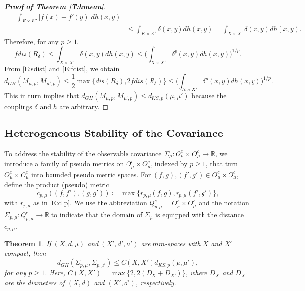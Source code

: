 \documentclass[11pt]{article}
\newtheorem{theorem}{Theorem}[section]
\theoremstyle{definition}
\newcommand{\real}{\ensuremath{\mathbb{R}}}
\newcommand{\cobs}[1]{\ensuremath{O^c_{#1}}}
\newcommand{\pcobsp}[1]{\ensuremath{Q^c_{p,#1}}}
\newcommand{\meanp}[1]{\ensuremath{M_{#1,p}}}
\newcommand{\dks}{\ensuremath{d_{KS,p}}}
\newcommand{\dgh}{\ensuremath{d_{GH}}}
\newcommand{\dlp}[1]{\ensuremath{r_{p,#1}}}
\newcommand{\dlpc}[1]{\ensuremath{c_{p,#1}}}
\newcommand{\covp}[1]{\ensuremath{\Sigma_{p,#1}}}
\begin{document}
\begin{proof}[\bf Proof of Theorem \ref{T:hmean}]
\begin{equation}
\begin{split}
= \int_{K\times K'} |f(x)-f'(y)| dh(x,y)\\
&\leq \int_{K\times K'} \delta(x,y) dh (x,y)
= \int_{X\times X'} \delta (x,y) dh (x,y).
\end{split}
\end{equation}
Therefore, for any $p\geq 1$,
\begin{equation} \label{E:fdist}
fdis(R_\delta) \leq \int_{X\times X'} \delta (x,y) dh (x,y)
\leq \Big(\int_{X\times X'} \delta^p (x,y) dh (x,y)\Big)^{1/p}.
\end{equation}
From \eqref{E:sdist} and \eqref{E:fdist}, we obtain
\begin{equation}
\dgh(\meanp{\mu}, \meanp{\mu'}) \leq \frac{1}{2} \max\{ dis (R_\delta), 2 fdis(R_\delta)\} \leq 
\Big(\int_{X\times X'} \delta^p (x,y) dh (x,y)\Big)^{1/p}.
\end{equation}
This in turn implies that $\dgh(\meanp{\mu}, \meanp{\mu'}) \leq \dks(\mu,\mu')$ because the couplings $\delta$ and $h$ are arbitrary.
\end{proof}


\subsection{Heterogeneous Stability of the Covariance}

To address the stability of the observable covariance $\Sigma_\mu \colon \cobs{\mu}\times \cobs{\mu} \to \real$, we introduce a family of pseudo metrics on $\cobs{\mu} \times \cobs{\mu}$, indexed by $p \geq 1$, that turn $\cobs{\mu} \times \cobs{\mu}$ into bounded pseudo metric spaces. For $(f,g), (f',g') \in \cobs{\mu} \times \cobs{\mu}$, define the product (pseudo) metric
\begin{equation} \label{E:dlpc}
\dlpc{\mu} ((f,f'), (g,g')) \coloneq
\max \{\dlp{\mu} (f,g), \dlp{\mu} (f',g')\},
\end{equation}
with $\dlp{\mu}$ as in \eqref{E:dlp}. We use the abbreviation $\pcobsp{\mu}= \cobs{\mu} \times \cobs{\mu}$ and the notation $\covp{\mu} \colon \pcobsp{\mu} \to \real$ to indicate that the domain of $\Sigma_\mu$ is equipped with the distance $\dlpc{\mu}$. 

\begin{theorem} \label{T:hcov}
If $(X,d,\mu)$ and $(X',d',\mu')$ are $mm$-spaces with $X$ and $X'$ compact, then
\[
\dgh(\covp{\mu}, \covp{\mu'}) \leq C(X,X') \dks(\mu,\mu'),
\]
for any $p \geq 1$. Here, $C(X,X')= \max\{2, 2(D_X+D_{X'})\}$, where $D_X$ and $D_{X'}$ are the diameters of $(X,d)$ and $(X',d')$, respectively.
\end{theorem}
\end{document}

